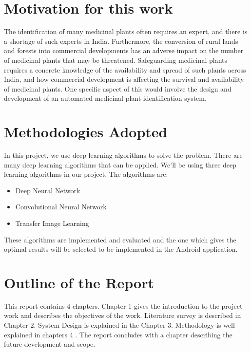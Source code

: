 \section{Motivation for this work}

The identification of many medicinal plants often requires an expert, and there is a shortage of such experts in India. Furthermore, the conversion of rural lands and forests into commercial developments has an adverse impact on the number of medicinal plants that may be threatened. Safeguarding medicinal plants requires a concrete knowledge of the availability and spread of such plants across India, and how commercial development is affecting the survival and availability of medicinal plants. One specific aspect of this would involve the design and development of an automated medicinal plant identification system.




\section{Methodologies Adopted}

In this project, we use deep learning algorithms to solve the problem. There are many deep learning algorithms that can be applied. We’ll be using three deep learning algorithms in our project. The algorithms are:
\begin{itemize}
\item{Deep Neural Network}
\item{Convolutional Neural Network}
\item{Transfer Image Learning}
\end{itemize}
These algorithms are implemented and evaluated and the one which gives the optimal results will be selected to be implemented in the Android application. 


\section{Outline of the Report}

This report contains 4 chapters. Chapter 1 gives the introduction to the project work and describes the objectives of the work. Literature survey is described in Chapter 2. System Design is explained in the Chapter 3. Methodology is well explained in chapters 4 . The report concludes with a chapter describing the future development and scope.


